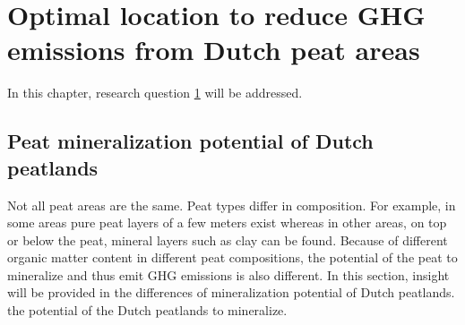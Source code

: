 \documentclass[a4paper,12pt]{scrbook}
\begin{document}
\chapter{Optimal location to reduce GHG emissions from Dutch peat areas} \label{ch:optloc}

In this chapter, research question \ref{ch:optloc} will be addressed.

\section{Peat mineralization potential of Dutch peatlands}

Not all peat areas are the same. Peat types differ in composition. For example, in some areas pure peat layers of a few meters exist whereas in other areas, on top or below the peat, mineral layers such as clay can be found. Because of different organic matter content in different peat compositions, the potential of the peat to mineralize and thus emit GHG emissions is also different. In this section, insight will be provided in the differences of mineralization potential of Dutch peatlands. the potential of the Dutch peatlands to mineralize. 


\end{document}

